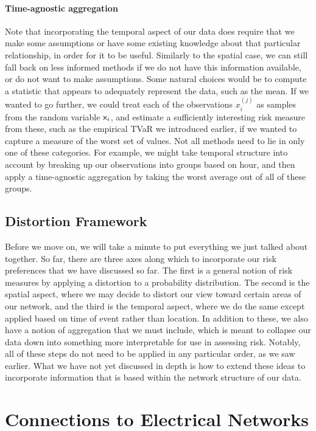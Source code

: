 \paragraph{Time-agnostic aggregation} Note that incorporating the temporal aspect of our data does require that we make some assumptions or have some existing knowledge about that particular relationship, in order for it to be useful. Similarly to the spatial case, we can still fall back on less informed methods if we do not have this information available, or do not want to make assumptions. Some natural choices would be to compute a statistic that appears to adequately represent the data, such as the mean. If we wanted to go further, we could treat each of the observations $x_i^{(j)}$ as samples from the random variable $\mathsf x_i$, and estimate a sufficiently interesting risk measure from these, such as the empirical TVaR we introduced earlier, if we wanted to capture a measure of the worst set of values. Not all methods need to lie in only one of these categories. For example, we might take temporal structure into account by breaking up our observations into groups based on hour, and then apply a time-agnostic aggregation by taking the worst average out of all of these groups.


\subsection{Distortion Framework}

Before we move on, we will take a minute to put everything we just talked about together. So far, there are three axes along which to incorporate our risk preferences that we have discussed so far. The first is a general notion of risk measures by applying a distortion to a probability distribution. The second is the spatial aspect, where we may decide to distort our view toward certain areas of our network, and the third is the temporal aspect, where we do the same except applied based on time of event rather than location. In addition to these, we also have a notion of aggregation that we must include, which is meant to collapse our data down into something more interpretable for use in assessing risk. Notably, all of these steps do not need to be applied in any particular order, as we saw earlier. What we have not yet discussed in depth is how to extend these ideas to incorporate information that is based within the network structure of our data.


\section{Connections to Electrical Networks}

